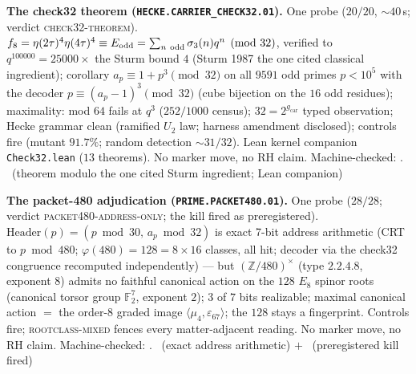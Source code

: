 \documentclass[11pt,a4paper]{article}
\newcommand{\gcar}{g_{\mathrm{car}}}
\newcommand{\Z}{\mathbb{Z}}
\theoremstyle{definition}
\begin{document}
\par\smallskip\noindent\textbf{The check32 theorem
(\texttt{HECKE.CARRIER\_CHECK32.01}).}
One probe ($20/20$, ${\sim}40$\,s; verdict
\textsc{check32-theorem}).  $f_8=\eta(2\tau)^4\eta(4\tau)^4\equiv
E_{\rm odd}=\sum_{n\ \rm odd}\sigma_3(n)q^n\pmod{32}$, verified to
$q^{100000}=25000\times$ the Sturm bound $4$ (Sturm 1987 the one
cited classical ingredient); corollary $a_p\equiv1+p^3\pmod{32}$
on all $9591$ odd primes $p<10^5$ with the decoder
$p\equiv(a_p-1)^3\pmod{32}$ (cube bijection on the $16$ odd
residues); maximality: mod $64$ fails at $q^3$ ($252/1000$
census); $32=2^{\gcar}$ typed observation; Hecke grammar clean
(ramified $U_2$ law; harness amendment disclosed); controls fire
(mutant $91.7\%$; random detection ${\sim}31/32$).  Lean kernel
companion \texttt{Check32.lean} ($13$ theorems).  No marker move,
no RH claim.
Machine-checked: .
\mE\ (theorem modulo the one cited Sturm ingredient; Lean
companion)
\par\smallskip

\par\smallskip\noindent\textbf{The packet-480 adjudication
(\texttt{PRIME.PACKET480.01}).}
One probe ($28/28$; verdict \textsc{packet480-address-only}; the
kill fired as preregistered).  $\mathrm{Header}(p)=(p\bmod30,\,
a_p\bmod32)$ is exact 7-bit address arithmetic (CRT to $p\bmod
480$; $\varphi(480)=128=8\times16$ classes, all hit; decoder via
the check32 congruence recomputed independently) --- but
$(\Z/480)^\times$ (type $2.2.4.8$, exponent $8$) admits no faithful
canonical action on the $128$ $E_8$ spinor roots (canonical torsor
group $\mathbb F_2^7$, exponent $2$); $3$ of $7$ bits realizable;
maximal canonical action $=$ the order-8 graded image
$\langle\mu_4,\varepsilon_{67}\rangle$; the $128$ stays a
fingerprint.  Controls fire; \textsc{rootclass-mixed} fences every
matter-adjacent reading.  No marker move, no RH claim.
Machine-checked: .
\mE\ (exact address arithmetic) $+$ \mX\ (preregistered kill fired)
\par\smallskip
\end{document}
